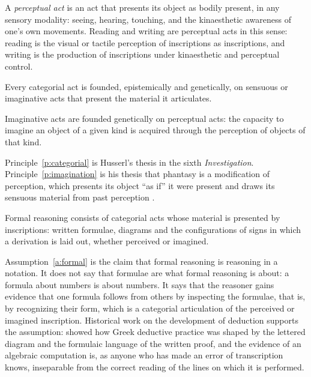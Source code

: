 \documentclass{situationist-preprint}
\begin{document}
\begin{definition}\label{d:perception}
A \emph{perceptual act} is an act that presents its object as bodily present, in any sensory modality: seeing, hearing, touching, and the kinaesthetic awareness of one's own movements. Reading and writing are perceptual acts in this sense: reading is the visual or tactile perception of inscriptions as inscriptions, and writing is the production of inscriptions under kinaesthetic and perceptual control.
\end{definition}

\begin{principle}\label{p:categorial}
Every categorial act is founded, epistemically and genetically, on sensuous or imaginative acts that present the material it articulates.
\end{principle}

\begin{principle}\label{p:imagination}
Imaginative acts are founded genetically on perceptual acts: the capacity to imagine an object of a given kind is acquired through the perception of objects of that kind.
\end{principle}

Principle~\ref{p:categorial} is Husserl's thesis in the sixth \emph{Investigation}. Principle~\ref{p:imagination} is his thesis that phantasy is a modification of perception, which presents its object \enquote{as if} it were present and draws its sensuous material from past perception \citep[§§39--40]{Husserl1939}.

\begin{assumption}\label{a:formal}
Formal reasoning consists of categorial acts whose material is presented by inscriptions: written formulae, diagrams and the configurations of signs in which a derivation is laid out, whether perceived or imagined.
\end{assumption}

Assumption~\ref{a:formal} is the claim that formal reasoning is reasoning in a notation. It does not say that formulae are what formal reasoning is about: a formula about numbers is about numbers. It says that the reasoner gains evidence that one formula follows from others by inspecting the formulae, that is, by recognizing their form, which is a categorial articulation of the perceived or imagined inscription. Historical work on the development of deduction supports the assumption: \citet{Netz1999} showed how Greek deductive practice was shaped by the lettered diagram and the formulaic language of the written proof, and the evidence of an algebraic computation is, as anyone who has made an error of transcription knows, inseparable from the correct reading of the lines on which it is performed.
\end{document}
